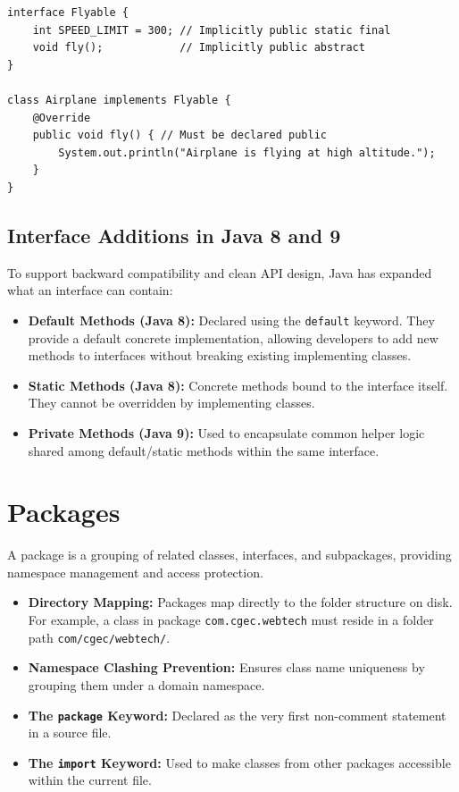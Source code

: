 \documentclass[12pt,a4paper]{article}
\begin{document}
\begin{verbatim}
interface Flyable {
    int SPEED_LIMIT = 300; // Implicitly public static final
    void fly();            // Implicitly public abstract
}

class Airplane implements Flyable {
    @Override
    public void fly() { // Must be declared public
        System.out.println("Airplane is flying at high altitude.");
    }
}
\end{verbatim}

\subsection{Interface Additions in Java 8 and 9}
To support backward compatibility and clean API design, Java has expanded what an interface can contain:
\begin{itemize}[leftmargin=*, itemsep=3pt]
  \item \textbf{Default Methods (Java 8):} Declared using the \texttt{default} keyword. They provide a default concrete implementation, allowing developers to add new methods to interfaces without breaking existing implementing classes.
  \item \textbf{Static Methods (Java 8):} Concrete methods bound to the interface itself. They cannot be overridden by implementing classes.
  \item \textbf{Private Methods (Java 9):} Used to encapsulate common helper logic shared among default/static methods within the same interface.
\end{itemize}

\section{Packages}

A package is a grouping of related classes, interfaces, and subpackages, providing namespace management and access protection.

\begin{tcolorbox}[defbox, title={\textbf{Java Packages}}]
\begin{itemize}[leftmargin=*, itemsep=3pt]
  \item \textbf{Directory Mapping:} Packages map directly to the folder structure on disk. For example, a class in package \texttt{com.cgec.webtech} must reside in a folder path \texttt{com/cgec/webtech/}.
  \item \textbf{Namespace Clashing Prevention:} Ensures class name uniqueness by grouping them under a domain namespace.
  \item \textbf{The \texttt{package} Keyword:} Declared as the very first non-comment statement in a source file.
  \item \textbf{The \texttt{import} Keyword:} Used to make classes from other packages accessible within the current file.
\end{itemize}
\end{tcolorbox}
\end{document}
